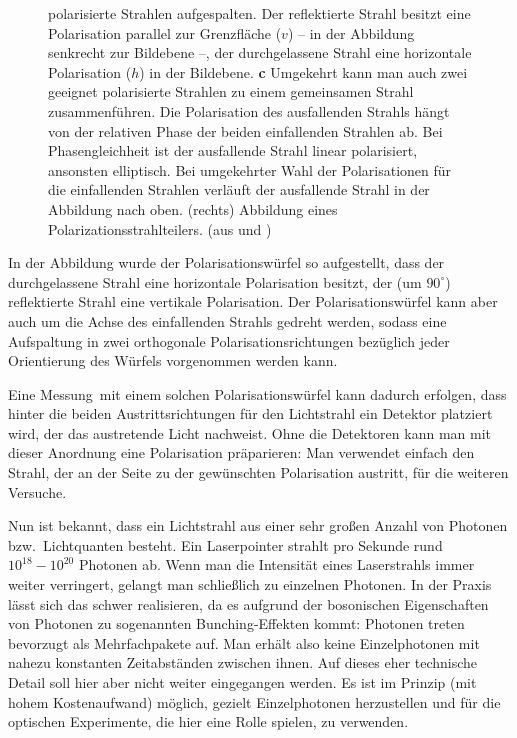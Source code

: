 \begin{figure}[htb]
{polarisierte Strahlen aufgespalten. Der reflektierte
Strahl besitzt eine Polarisation parallel zur 
Grenzfl\"ache ($v$) -- in der Abbildung senkrecht
zur Bildebene --, der durchgelassene Strahl
eine horizontale Polarisation ($h$) in der Bildebene. 
\textbf{c} Umgekehrt kann
man auch zwei geeignet polarisierte Strahlen zu einem
gemeinsamen Strahl zusammenf\"uhren. Die Polarisation
des ausfallenden Strahls h\"angt von der relativen Phase
der beiden einfallenden Strahlen ab. Bei Phasengleichheit
ist der ausfallende Strahl linear polarisiert, an\-sons\-ten
elliptisch. Bei umgekehrter Wahl der Polarisationen f\"ur die
einfallenden Strahlen verl\"auft der ausfallende Strahl
in der Abbildung nach oben. (rechts) Abbildung eines Polarizationsstrahlteilers. (aus \cite{Filk} und \cite{?})}
\end{figure}

In der Abbildung wurde der Polarisationsw\"urfel 
so aufgestellt, dass der durchgelassene
Strahl eine horizontale Polarisation besitzt, der (um $90^\circ$) reflektierte Strahl eine
vertikale Polarisation. Der Polarisationsw\"urfel kann aber auch um die Achse des einfallenden
Strahls gedreht werden, sodass eine Aufspaltung in zwei orthogonale Polarisationsrichtungen
bez\"uglich jeder Orientierung des W\"urfels vorgenommen werden kann. 

Eine \glqq Messung\grqq\ mit einem solchen Polarisationsw\"urfel kann dadurch erfolgen,
dass hinter die beiden Austrittsrichtungen f\"ur den Lichtstrahl ein Detektor platziert wird,
der das austretende Licht nachweist. Ohne die Detektoren kann man mit dieser Anordnung
eine Polarisation pr\"aparieren: Man verwendet einfach den Strahl, der an der Seite zu
der gew\"unschten Polarisation austritt, f\"ur die weiteren Versuche. 

Nun ist bekannt, dass ein Lichtstrahl aus einer sehr gro\ss en Anzahl von Photonen bzw.\
Lichtquanten besteht. Ein Laserpointer strahlt pro Sekunde rund $10^{18}-10^{20}$ Photonen ab.
Wenn man die Intensit\"at eines Laserstrahls immer weiter verringert, gelangt man schlie\ss lich
zu einzelnen Photonen. In der Praxis l\"asst sich das schwer realisieren, da es aufgrund der
bosonischen Eigenschaften von Photonen zu sogenannten\index{Bunching} 
Bunching-Effekten kommt: Photonen
treten bevorzugt als Mehrfachpakete auf. Man erh\"alt also keine Einzelphotonen mit
nahezu konstanten Zeitabst\"anden zwischen ihnen. Auf dieses eher technische Detail soll hier aber
nicht weiter eingegangen werden. Es ist im Prinzip (mit hohem Kostenaufwand) m\"oglich,
gezielt Einzelphotonen herzustellen und f\"ur die optischen Experimente, die hier eine Rolle spielen,
zu verwenden. 

